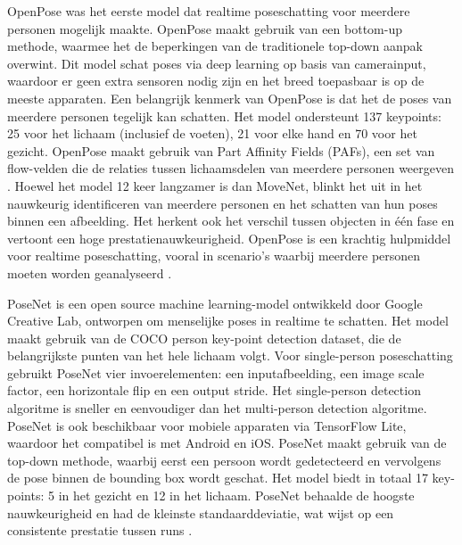 OpenPose was het eerste model dat realtime poseschatting voor meerdere personen mogelijk maakte. 
OpenPose maakt gebruik van een bottom-up methode, waarmee het de beperkingen van de traditionele top-down aanpak overwint. 
Dit model schat poses via deep learning op basis van camerainput, waardoor er geen extra sensoren nodig zijn en het breed toepasbaar is op de meeste apparaten. 
Een belangrijk kenmerk van OpenPose is dat het de poses van meerdere personen tegelijk kan schatten. 
Het model ondersteunt 137 keypoints: 25 voor het lichaam (inclusief de voeten), 21 voor elke hand en 70 voor het gezicht.
OpenPose maakt gebruik van Part Affinity Fields (PAFs), een set van flow-velden die de relaties tussen lichaamsdelen van meerdere personen weergeven \autocite{KanaseEtAl2021}.  
Hoewel het model 12 keer langzamer is dan MoveNet, blinkt het uit in het nauwkeurig identificeren van meerdere personen en het schatten van hun poses binnen een afbeelding. 
Het herkent ook het verschil tussen objecten in één fase en vertoont een hoge prestatienauwkeurigheid.
OpenPose is een krachtig hulpmiddel voor realtime poseschatting, vooral in scenario's waarbij meerdere personen moeten worden geanalyseerd \autocite{BeomjunEtAl2022}.

PoseNet is een open source machine learning-model ontwikkeld door Google Creative Lab, ontworpen om menselijke poses in realtime te schatten. 
Het model maakt gebruik van de COCO person key-point detection dataset, die de belangrijkste punten van het hele lichaam volgt. 
Voor single-person poseschatting gebruikt PoseNet vier invoerelementen: een inputafbeelding, een image scale factor, een horizontale flip en een output stride. 
Het single-person detection algoritme is sneller en eenvoudiger dan het multi-person detection algoritme. 
PoseNet is ook beschikbaar voor mobiele apparaten via TensorFlow Lite, waardoor het compatibel is met Android en iOS. 
PoseNet maakt gebruik van de top-down methode, waarbij eerst een persoon wordt gedetecteerd en vervolgens de pose binnen de bounding box wordt geschat. 
Het model biedt in totaal 17 key-points: 5 in het gezicht en 12 in het lichaam. 
PoseNet behaalde de hoogste nauwkeurigheid en had de kleinste standaarddeviatie, wat wijst op een consistente prestatie tussen runs \autocite{BeomjunEtAl2022}.

